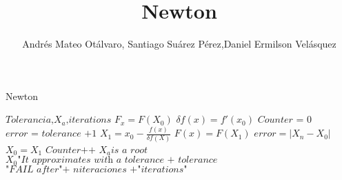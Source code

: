 \documentclass{article}
\title{Newton}
\author{Andrés Mateo Otálvaro, Santiago Suárez Pérez,Daniel Ermilson Velásquez}
\begin{document}
\maketitle
\begin{algorithm}
\caption{Newton}\label{numerical methods}
\begin{algorithmic}[1]
	\State $\textit{Tolerancia,$X_a$,iterations}$
	\State $F_x = F(X_0)$
	\State $\delta f(x)=f'(x_0)$
	\State $\textit{Counter = 0}$
	\State $\textit{error = tolerance +1} $
			\State $X_1=x_0-\frac{f(x)}{\delta f(X)}$
			\State $F(x)=F(X_1)$
			\State $\textit{error}=|X_n-X_0|$
			\State $X_0=X_1$
			\State $\textit{Counter++}$
		\EndWhile
			\State $X_a \textit{is a root}$
			\State $X_0 \textit{"It approximates with a tolerance + tolerance}$
		\Else
			\State $\textit{"FAIL after"+ niteraciones +"iterations"}$
		\EndIf
\EndProcedure
\end{algorithmic}
\end{algorithm}
\end{document}
